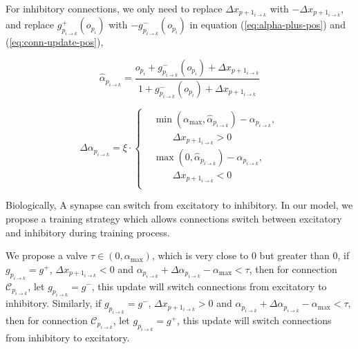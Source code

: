 \documentclass[conference]{IEEEtran}
\begin{document}
For inhibitory connections, we only need to replace
$\Delta x_{p+1_{i\rightarrow{k}}}$ with $-\Delta x_{p+1_{i\rightarrow{k}}}$,
and replace $g^{+}_{p_{i\rightarrow{k}}}(o_{p_i})$ with
$-g^{-}_{p_{i\rightarrow{k}}}(o_{p_i})$ in equation (\ref{eq:alpha-plus-pos})
and (\ref{eq:conn-update-pos}),

\begin{equation}
    \hat{\alpha}_{p_{i\rightarrow{k}}}=
        \frac{ o_{p_i}+g^{-}_{p_{i\rightarrow{k}}}(o_{p_i})+\Delta x_{p+1_{i\rightarrow{k}}} }{
        1+g^{-}_{p_{i\rightarrow{k}}}(o_{p_i})+\Delta x_{p+1_{i\rightarrow{k}}} }
    \label{eq:alpha-plus-neg}
\end{equation}

\begin{equation}
    \Delta\alpha_{p_{i\rightarrow{k}}} =\xi\cdot
    \left\{
        \begin{aligned}
            &\min\left(\alpha_{\max},\hat{\alpha}_{p_{i\rightarrow{k}}}\right)-\alpha_{p_{i\rightarrow{k}}},\\
            &\quad\quad\Delta x_{p+1_{i\rightarrow{k}}}>0\\
            &\max\left(0,\hat{\alpha}_{p_{i\rightarrow{k}}}\right)-\alpha_{p_{i\rightarrow{k}}},\\
            &\quad\quad\Delta x_{p+1_{i\rightarrow{k}}}<0\\
        \end{aligned}
        \right.
    \label{eq:conn-update-neg}
\end{equation}

Biologically, A synapse can switch from excitatory to
inhibitory\cite{ganguly2001gaba}. In our model, we propose
a training strategy which allows connections switch between
excitatory and inhibitory during training process.

We propose a valve $\tau\in(0,\alpha_{\max})$, which is very close to 0 but greater
than 0, if $g_{p_{i\rightarrow{k}}}=g^{+}$, $\Delta x_{p+1_{i\rightarrow{k}}}<0$
and $\alpha_{p_{i\rightarrow{k}}}+\Delta\alpha_{p_{i\rightarrow{k}}}-\alpha_{\max}<\tau$,
then for connection $\mathcal{C}_{p_{i\rightarrow{k}}}$, let $g_{p_{i\rightarrow{k}}}=g^{-}$, this update will
switch connections from excitatory to inhibitory.
Similarly, if $g_{p_{i\rightarrow{k}}}=g^{-}$, $\Delta x_{p+1_{i\rightarrow{k}}}>0$
and $\alpha_{p_{i\rightarrow{k}}}+\Delta\alpha_{p_{i\rightarrow{k}}}-\alpha_{\max}<\tau$,
then for connection $\mathcal{C}_{p_{i\rightarrow{k}}}$, let $g_{p_{i\rightarrow{k}}}=g^{+}$, this update will
switch connections from inhibitory to excitatory.
\end{document}
